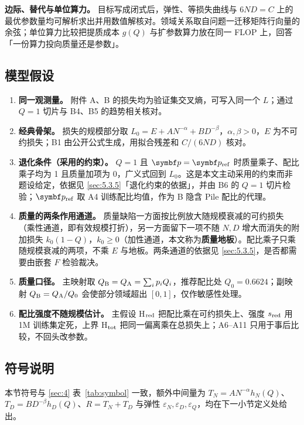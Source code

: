 \textbf{边际、替代与单位算力。} 目标写成闭式后，弹性、等损失曲线与 $6ND=C$ 上的最优参数量均可解析求出并用数值解核对。领域关系取自问题一迁移矩阵行向量的余弦；单位算力比较把提质成本 $g(Q)$ 与扩参数算力放在同一 FLOP 上，回答「一份算力投向质量还是参数」。

\subsection{模型假设}
\label{sec:5.3.3}

\begin{enumerate}
\item \textbf{同一观测量。} 附件 A、B 的损失均为验证集交叉熵，可写入同一个 $L$；通过 $Q=1$ 切片与 B4、B5 的趋势相关核对。
\item \textbf{经典骨架。} 损失的规模部分取 $L_0=E+AN^{-\alpha}+BD^{-\beta}$，$\alpha,\beta>0$，$E$ 为不可约损失；B1 由公开公式生成，用拟合残差和 $C/(6ND)$ 核对。
\item \textbf{退化条件（采用的约束）。} $Q=1$ 且 $\bp=\bp_{\rm ref}$ 时质量乘子、配比乘子均为 1 且质量加项为 0，广义式回到 $L_0$。这是本文主动采用的约束而非题设给定，依据见 \ref{sec:5.3.5}「退化约束的依据」，并由 B6 的 $Q=1$ 切片检验；$\bp_{\rm ref}$ 取 A4 训练配比均值，作为 B 隐含 Pile 配比的代理。
\item \textbf{质量的两条作用通道。} 质量缺陷一方面按比例放大随规模衰减的可约损失（乘性通道，即有效规模打折），另一方面留下一项不随 $N,D$ 增大而消失的附加损失 $k_0(1-Q)$，$k_0\ge0$（加性通道，本文称为\textbf{质量地板}）。配比乘子只乘随规模衰减的两项，不乘 $E$ 与地板。两条通道的依据见 \ref{sec:5.3.5}，是否都需要由嵌套 $F$ 检验裁决。
\item \textbf{质量口径。} 主映射取 $Q_{\rm B}=Q_{\rm A}=\sum_i p_iQ_i$，推荐配比处 $Q_0=0.6624$；副映射 $Q_{\rm B}=Q_{\rm A}/Q_0$ 会使部分领域超出 $[0,1]$，仅作敏感性处理。
\item \textbf{配比强度不随规模估计。} 主假设 H$_{\rm red}$ 把配比乘在可约损失上、强度 $s_{\rm red}$ 用 1M 训练集定死，上界 H$_{\rm tot}$ 把同一偏离乘在总损失上；A6–A11 只用于事后比较，不回头改参数。
\end{enumerate}

\subsection{符号说明}
\label{sec:5.3.4}

本节符号与 \ref{sec:4} 表~\ref{tab:symbol} 一致，额外中间量为 $T_N=AN^{-\alpha}h_N(Q)$、$T_D=BD^{-\beta}h_D(Q)$、$R=T_N+T_D$ 与弹性 $\varepsilon_N,\varepsilon_D,\varepsilon_Q$，均在下一小节定义处给出。

